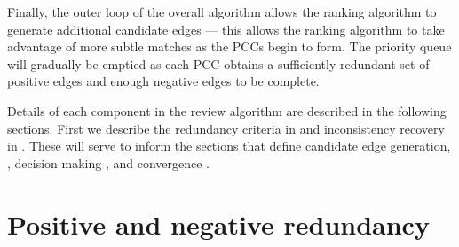 Finally, the outer loop of the overall algorithm allows the ranking algorithm to generate additional candidate
edges --- this allows the ranking algorithm to take advantage of more subtle matches as the PCCs begin to form. The
priority queue will gradually be emptied as each PCC obtains a sufficiently redundant set of positive edges and
enough negative edges to be complete.

Details of each component in the review algorithm are described in the following sections.  First we describe the
redundancy criteria in  and inconsistency recovery in . These will serve to inform
the sections that define candidate edge generation, , decision making ,  and
convergence .


\section{Positive and negative redundancy}\label{sec:redun}


